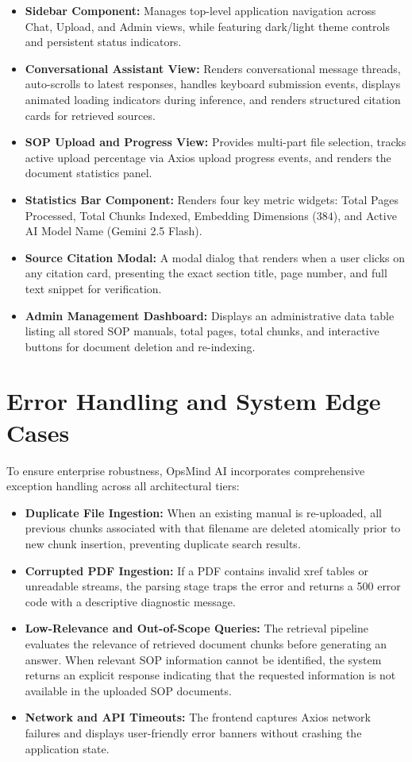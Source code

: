 \begin{itemize}
    \item \textbf{Sidebar Component:} Manages top-level application navigation across Chat, Upload, and Admin views, while featuring dark/light theme controls and persistent status indicators.
    \item \textbf{Conversational Assistant View:} Renders conversational message threads, auto-scrolls to latest responses, handles keyboard submission events, displays animated loading indicators during inference, and renders structured citation cards for retrieved sources.
    \item \textbf{SOP Upload and Progress View:} Provides multi-part file selection, tracks active upload percentage via Axios upload progress events, and renders the document statistics panel.
    \item \textbf{Statistics Bar Component:} Renders four key metric widgets: Total Pages Processed, Total Chunks Indexed, Embedding Dimensions ($384$), and Active AI Model Name (Gemini 2.5 Flash).
    \item \textbf{Source Citation Modal:} A modal dialog that renders when a user clicks on any citation card, presenting the exact section title, page number, and full text snippet for verification.
    \item \textbf{Admin Management Dashboard:} Displays an administrative data table listing all stored SOP manuals, total pages, total chunks, and interactive buttons for document deletion and re-indexing.
\end{itemize}

\section{Error Handling and System Edge Cases}
\label{sec:impl_error_handling}

To ensure enterprise robustness, OpsMind AI incorporates comprehensive exception handling across all architectural tiers:

\begin{itemize}
    \item \textbf{Duplicate File Ingestion:} When an existing manual is re-uploaded, all previous chunks associated with that filename are deleted atomically prior to new chunk insertion, preventing duplicate search results.
    \item \textbf{Corrupted PDF Ingestion:} If a PDF contains invalid xref tables or unreadable streams, the parsing stage traps the error and returns a 500 error code with a descriptive diagnostic message.
    \item \textbf{Low-Relevance and Out-of-Scope Queries:} The retrieval pipeline evaluates the relevance of retrieved document chunks before generating an answer. When relevant SOP information cannot be identified, the system returns an explicit response indicating that the requested information is not available in the uploaded SOP documents.
    \item \textbf{Network and API Timeouts:} The frontend captures Axios network failures and displays user-friendly error banners without crashing the application state.
\end{itemize}
